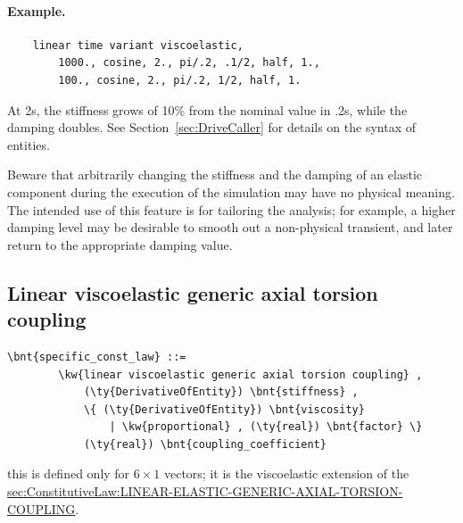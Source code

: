 \paragraph{Example.}
\begin{verbatim}
    linear time variant viscoelastic,
        1000., cosine, 2., pi/.2, .1/2, half, 1.,
        100., cosine, 2., pi/.2, 1/2, half, 1.
\end{verbatim}
At 2s, the stiffness grows of 10\% from the nominal value in .2s,
while the damping doubles.
See Section~\ref{sec:DriveCaller} for details on the syntax
of  entities.

Beware that arbitrarily changing the stiffness
and the damping of an elastic component during the execution
of the simulation may have no physical meaning.
The intended use of this feature is for tailoring the analysis;
for example, a higher damping level may be desirable to smooth out
a non-physical transient, and later return to the appropriate damping value.
  
\subsection{Linear viscoelastic generic axial torsion coupling}
\begin{Verbatim}[commandchars=\\\{\}]
    \bnt{specific_const_law} ::= 
        \kw{linear viscoelastic generic axial torsion coupling} ,
            (\ty{DerivativeOfEntity}) \bnt{stiffness} ,
            \{ (\ty{DerivativeOfEntity}) \bnt{viscosity} 
                | \kw{proportional} , (\ty{real}) \bnt{factor} \}
            (\ty{real}) \bnt{coupling_coefficient}
\end{Verbatim}
this is defined only for $6 \times 1$ vectors; it is the viscoelastic 
extension of the 
\hyperref{\kw{linear elastic generic axial torsion coupling} constitutive law}{\kw{linear elastic generic axial torsion coupling} constitutive law (see Section~}{)}{sec:ConstitutiveLaw:LINEAR-ELASTIC-GENERIC-AXIAL-TORSION-COUPLING}.


